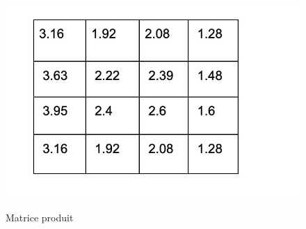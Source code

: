 \begin{figure}[h]
\begin{center}
\includegraphics[width=15cm,height=8cm]{images/factorisation_result.jpeg}
\caption[Matrice produit]{Matrice produit}
\label{monlabel}
\end{center}
\end{figure}

